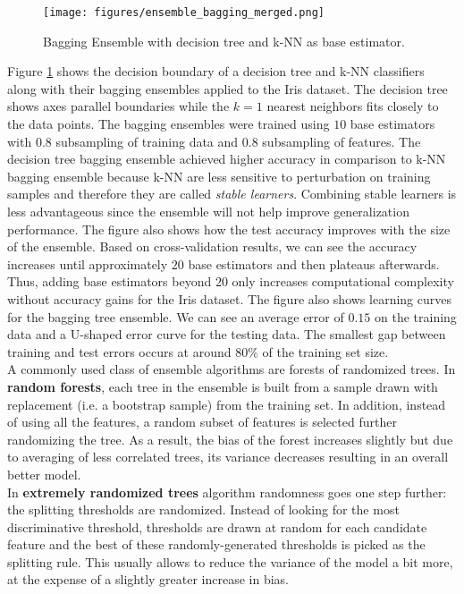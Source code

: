 \begin{figure}[tbhp]
    \centering
    \texttt{[image: figures/ensemble\_bagging\_merged.png]}
    \caption{Bagging Ensemble with decision tree and k-NN as base estimator.}
    \label{fig:ensemble_bagging}
\end{figure}

Figure \ref{fig:ensemble_bagging} shows the decision boundary of a decision tree and k-NN classifiers along with their bagging ensembles applied to the Iris dataset. The decision tree shows axes parallel boundaries while the $k=1$ nearest neighbors fits closely to the data points. The bagging ensembles were trained using $10$ base estimators with $0.8$ subsampling of training data and $0.8$ subsampling of features. The decision tree bagging ensemble achieved higher accuracy in comparison to k-NN bagging ensemble because k-NN are less sensitive to perturbation on training samples and therefore they are called \textit{stable learners}. Combining stable learners is less advantageous since the ensemble will not help improve generalization performance. The figure also shows how the test accuracy improves with the size of the ensemble. Based on cross-validation results, we can see the accuracy increases until approximately $20$ base estimators and then plateaus afterwards. Thus, adding base estimators beyond $20$ only increases computational complexity without accuracy gains for the Iris dataset. The figure also shows learning curves for the bagging tree ensemble. We can see an average error of $0.15$ on the training data and a U-shaped error curve for the testing data. The smallest gap between training and test errors occurs at around $80\%$ of the training set size.\\

A commonly used class of ensemble algorithms are forests of randomized trees. In \textbf{random forests}, each tree in the ensemble is built from a sample drawn with replacement (i.e. a bootstrap sample) from the training set. In addition, instead of using all the features, a random subset of features is selected further randomizing the tree. As a result, the bias of the forest increases slightly but due to averaging of less correlated trees, its variance decreases resulting in an overall better model.\\

In \textbf{extremely randomized trees} algorithm randomness goes one step further: the splitting thresholds are randomized. Instead of looking for the most discriminative threshold, thresholds are drawn at random for each candidate feature and the best of these randomly-generated thresholds is picked as the splitting rule. This usually allows to reduce the variance of the model a bit more, at the expense of a slightly greater increase in bias.\\  


